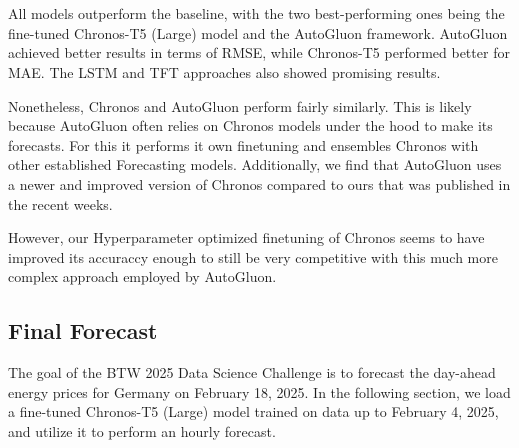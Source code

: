 \documentclass[a4paper]{article}
\begin{document}
    \begin{center}
    \end{center}
    { \hspace*{\fill} \\}
    
    \begin{center}
    \end{center}
    { \hspace*{\fill} \\}
    
    All models outperform the baseline, with the two best-performing ones
being the fine-tuned Chronos-T5 (Large) model and the AutoGluon
framework. AutoGluon achieved better results in terms of RMSE, while
Chronos-T5 performed better for MAE. The LSTM and TFT approaches also
showed promising results.

Nonetheless, Chronos and AutoGluon perform fairly similarly. This is
likely because AutoGluon often relies on Chronos models under the hood
to make its forecasts. For this it performs it own finetuning and
ensembles Chronos with other established Forecasting models.
Additionally, we find that AutoGluon uses a newer and improved version
of Chronos compared to ours that was published in the recent weeks.

However, our Hyperparameter optimized finetuning of Chronos seems to
have improved its accuraccy enough to still be very competitive with
this much more complex approach employed by AutoGluon.

    \subsection{Final Forecast}\label{final-forecast}

    The goal of the BTW 2025 Data Science Challenge is to forecast the
day-ahead energy prices for Germany on February 18, 2025. In the
following section, we load a fine-tuned Chronos-T5 (Large) model trained
on data up to February 4, 2025, and utilize it to perform an hourly
forecast.
\end{document}
